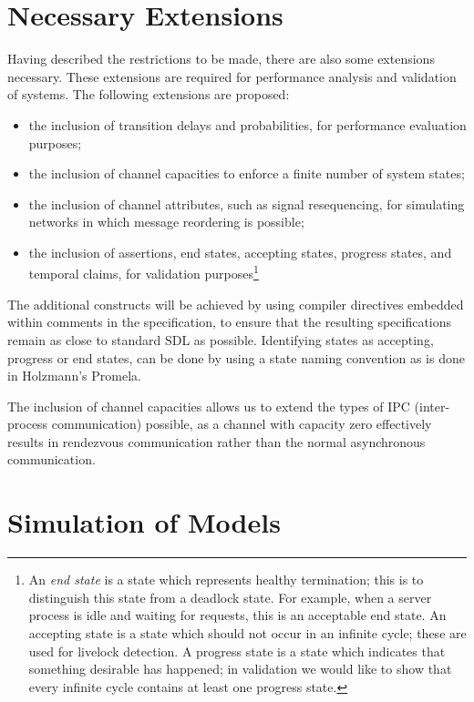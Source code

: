 \section{Necessary Extensions}

Having described the restrictions to be made, there are also some
extensions necessary. These extensions are required for performance
analysis and validation of systems. The following extensions are proposed:

\begin{itemize}
\item the inclusion of transition delays and probabilities,
for performance evaluation purposes;
\item the inclusion of channel capacities to enforce a finite number of
system states;
\item the inclusion of channel attributes, such as signal
resequencing, for simulating networks in which message reordering is
possible;
\item the inclusion of assertions, end states, accepting states, progress
states, and temporal claims, for validation purposes\footnote{An {\em
end state} is a state which represents healthy termination; this is
to distinguish this state from a deadlock state. For example, when a
server process is idle and waiting for requests, this is an
acceptable end state. An accepting state is a state which should not
occur in an infinite cycle; these are used for livelock detection. A
progress state is a state which indicates that something desirable
has happened; in validation we would like to show that every infinite
cycle contains at least one progress state.}
\end{itemize}

The additional constructs will be achieved by using compiler
directives embedded within comments in the specification, to ensure
that the resulting specifications remain as close to standard SDL as
possible. Identifying states as accepting, progress or end states,
can be done by using a state naming convention as is done in
Holzmann's Promela.

The inclusion of channel capacities allows us to extend the types of IPC
(inter-process communication) possible, as a channel with capacity zero
effectively results in rendezvous communication rather than the normal 
asynchronous communication.

\section{Simulation of Models}

